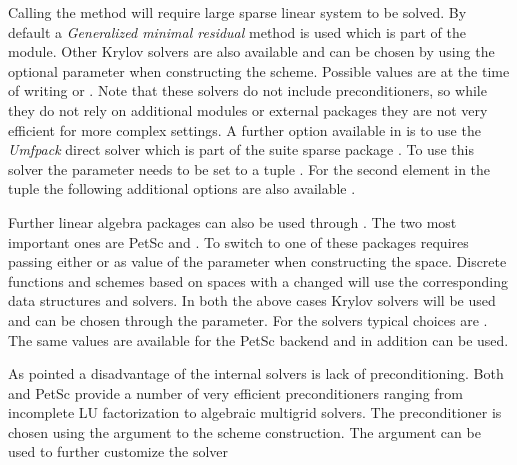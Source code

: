Calling the method  will require large sparse linear
system to be solved. By default a
\emph{Generalized minimal residual} method is used which is part of the
\dune[fem] module. Other Krylov solvers are also available and can be
chosen by using the optional parameter  when constructing the
scheme. Possible values are at the time of writing
 or .
Note that these solvers do not include preconditioners, so while they do
not rely on additional \dune{} modules or external packages they are not
very efficient for more complex settings. A further option available in
\dune[fem] is to use the \emph{Umfpack} direct solver which is part of the
suite sparse package \cite{suitesparse}. To use this solver the
 parameter needs to be set to a tuple
. For the second element in the tuple
the following additional options are also available
.

Further linear algebra packages can also be used through \dune[fempy]. The
two most important ones are
PetSc \cite{petsc} and \dune[istl] \cite{duneistl}. To switch to one of
these packages requires passing either  or
 as value of the  parameter when constructing
the space. Discrete functions and schemes based on spaces with a changed
 will use the corresponding data structures and solvers.
In both the above cases Krylov solvers will be used and can be chosen
through the  parameter. For the \dune[istl] solvers
typical choices are .
The same values are available for the PetSc backend and in addition
 can be used.

As pointed a disadvantage of the \dune[fem] internal solvers is lack of
preconditioning. Both \dune[istl] and PetSc provide a number of very
efficient preconditioners ranging from incomplete LU factorization to
algebraic multigrid solvers. The preconditioner is chosen using the
 argument to the scheme construction.
The  argument can be used to further customize the solver

